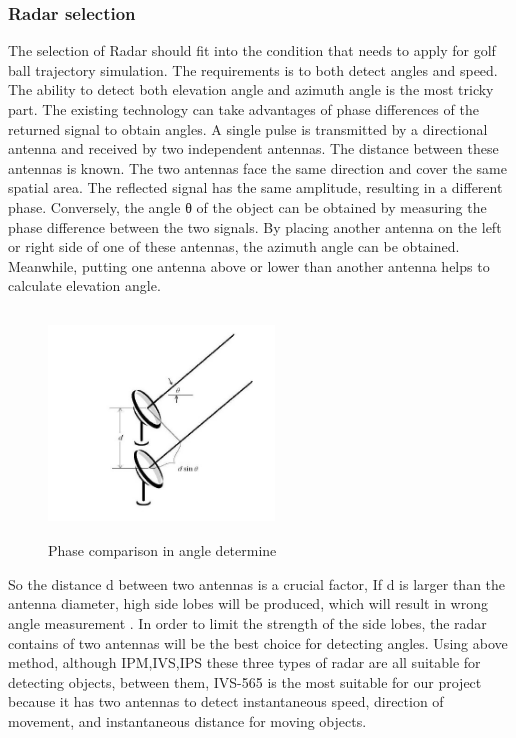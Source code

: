 \subsubsection{Radar selection}
The selection of Radar should fit into the condition that needs to apply for golf ball trajectory simulation. The requirements is to both detect angles and speed. The ability to detect both elevation angle and azimuth angle is the most tricky part. The existing technology can take advantages of phase differences of the returned signal to obtain angles.
A single pulse is transmitted by a directional antenna and received by two independent antennas. The distance between these antennas is known. The two antennas face the same direction and cover the same spatial area. The reflected signal has the same amplitude, resulting in a different phase.
Conversely, the angle θ of the object can be obtained by measuring the phase difference between the two signals. By placing another antenna on the left or right side of one of these antennas, the azimuth angle can be obtained. Meanwhile, putting one antenna above or lower than another antenna helps to calculate elevation angle.
\begin{figure}[H]
    \centering
    \includegraphics[width=6cm,height=6cm]{figure/phase comparison in angle determine .jpg}
    \caption{Phase comparison in angle determine}
\end{figure}
So the distance d between two antennas is a crucial factor, If d is larger than the antenna diameter, high side lobes will be produced, which will result in wrong angle measurement . In order to limit the strength of the side lobes, the radar contains of two antennas will be the best choice for detecting angles.
Using above method, although IPM,IVS,IPS these three types of radar are all suitable for detecting objects, between them, IVS-565 is the most suitable for our project because it has two antennas to detect instantaneous speed, direction of movement, and instantaneous distance for moving objects. 
